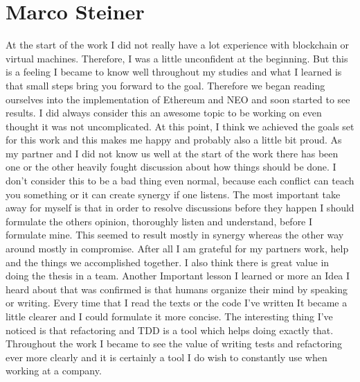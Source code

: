 \section{Marco Steiner}
At the start of the work I did not really have a lot experience with blockchain or virtual machines. Therefore, I was a little unconfident at the beginning. But this is a feeling I became to know well throughout my studies and what I learned is that small steps bring you forward to the goal. Therefore we began reading ourselves into the implementation of Ethereum and NEO and soon started to see results. I did always consider this an awesome topic to be working on even thought it was not uncomplicated. At this point, I think we achieved the goals set for this work and this makes me happy and probably also a little bit proud. 
As my partner and I did not know us well at the start of the work there has been one or the other heavily fought discussion about how things should be done. I don’t consider this to be a bad thing even normal, because each conflict can teach you something or it can create synergy if one listens. The most important take away for myself is that in order to resolve discussions before they happen I should formulate the others opinion, thoroughly listen and understand, before I formulate mine. This seemed to result mostly in synergy whereas the other way around mostly in compromise. After all I am grateful for my partners work, help and the things we accomplished together. I also think there is great value in doing the thesis in a team. 
Another Important lesson I learned or more an Idea I heard about that was confirmed is that humans organize their mind by speaking or writing. Every time that I read the texts or the code I’ve written It became a little clearer and I could formulate it more concise. The interesting thing I’ve noticed is that refactoring and TDD is a tool which helps doing exactly that. Throughout the work I became to see the value of writing tests and refactoring ever more clearly and it is certainly a tool I do wish to constantly use when working at a company.
